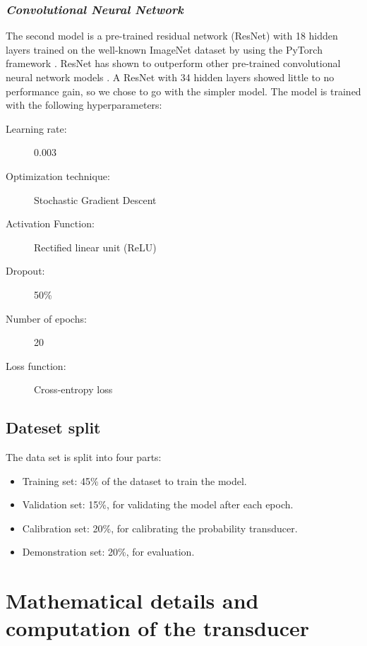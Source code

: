 \documentclass[\ifafour a4paper,12pt,\else a5paper,10pt,\fi%
onecolumn,oneside,article,%
british%
]{memoir}
\theoremstyle{remark}
\theoremstyle{innote}
\renewcommand*{\|}[1][]{\nonscript\:#1\vert\nonscript\:\mathopen{}}
\begin{document}
\subsubsection{\textit{Convolutional Neural Network}} 
The second model is a pre-trained residual network (ResNet) \autocites{heetal2016} with 18 hidden layers trained on the well-known ImageNet dataset  \autocites{russakovskyetal2015} by using the PyTorch framework \autocites{paszkeetal2019}. ResNet has shown to outperform other pre-trained convolutional neural network models \autocites{heetal2016}. A ResNet with 34 hidden layers showed little to no performance gain, so we chose to go with the simpler model. The model is trained with the following hyperparameters:
\medskip

\begin{framed}
  \begin{description}
  \item[Learning rate:] 0.003 
  \item[Optimization technique:] Stochastic Gradient Descent 
  \item[Activation Function:] Rectified linear unit (ReLU) 
  \item[Dropout:] 50\% 
  \item[Number of epochs:] 20 
  \item[Loss function:] Cross-entropy loss
  \end{description}
\end{framed}

\subsection{Dateset split}

The data set is split into four parts:
\begin{itemize}
\item Training set: 45\% of the dataset to train the model.
\item Validation set: 15\%, for validating the model after each epoch.
\item Calibration set: 20\%, for calibrating the probability transducer.
\item Demonstration set: 20\%, for evaluation.
\end{itemize}

\bigskip

\section{Mathematical details and computation of the transducer}
\label{sec:maths_transducer}
\end{document}
